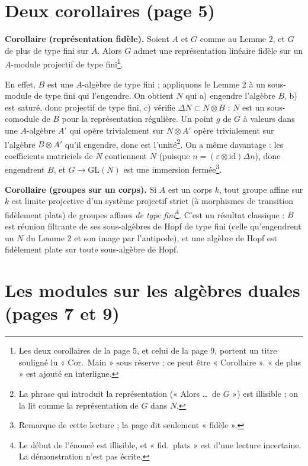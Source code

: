 \documentclass[11pt,a4paper]{article}
\begin{document}
\section*{Deux corollaires (page 5)}

\textbf{Corollaire (représentation fidèle).} Soient $A$ et $G$ comme au
Lemme 2, et $G$ de plus de type fini sur $A$. Alors $G$ admet une
représentation linéaire fidèle sur un $A$-module projectif de type
fini\footnote{Les deux corollaires de la page 5, et celui de la page 9,
portent un titre souligné lu « Cor.\ Main » sous réserve ; ce peut être
« Corollaire ». « de plus » est ajouté en interligne.}.

En effet, $B$ est une $A$-algèbre de type fini ; appliquons le Lemme 2 à
un sous-module de type fini qui l'engendre. On obtient $N$ qui a) engendre
l'algèbre $B$, b) est saturé, donc projectif de type fini, c) vérifie
$\Delta N \subset N \otimes B$ : $N$ est un sous-comodule de $B$ pour la
représentation régulière. Un point $g$ de $G$ à valeurs dans une
$A$-algèbre $A'$ qui opère trivialement sur $N \otimes A'$ opère
trivialement sur l'algèbre $B \otimes A'$ qu'il engendre, donc est
l'unité\footnote{La phrase qui introduit la représentation (« Alors \ldots\
de $G$ ») est illisible ; on la lit comme la représentation de $G$ dans
$N$.}. On a même davantage : les coefficients matriciels de $N$ contiennent
$N$ (puisque $n = (\varepsilon \otimes \mathrm{id})\Delta n$), donc
engendrent $B$, et $G \to \mathrm{GL}(N)$ est une immersion
fermée\footnote{Remarque de cette lecture ; la page dit seulement
« fidèle ».}.

\textbf{Corollaire (groupes sur un corps).} Si $A$ est un corps $k$, tout
groupe affine sur $k$ est limite projective d'un système projectif strict
(à morphismes de transition fidèlement plats) de groupes affines
\emph{de type fini}\footnote{Le début de l'énoncé est illisible, et
« fid.\ plats » est d'une lecture incertaine. La démonstration n'est pas
écrite.}. C'est un résultat classique : $B$ est réunion filtrante de ses
sous-algèbres de Hopf de type fini (celle qu'engendrent un $N$ du Lemme 2 et
son image par l'antipode), et une algèbre de Hopf est fidèlement plate sur
toute sous-algèbre de Hopf.

\section*{Les modules sur les algèbres duales (pages 7 et 9)}
\end{document}

